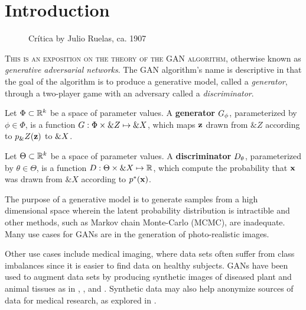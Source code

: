 \section{Introduction}  \setcounter{page}{1}

\vspace{1cm}

\begin{figure}[h]
  \label{fig:paradise} \centering
{}
  \caption{Crítica by Julio Ruelas, ca. 1907}
\end{figure}

\vspace{1cm}

\lettrine[lines=3]{\Royal T}{his is an exposition on the theory of the
GAN algorithm}, otherwise known as \textit{generative adversarial
networks}. The GAN algorithm's name is descriptive in that the goal of
the algorithm is to produce a generative model, called a
\textit{generator}, through a two-player game with an adversary called
a \textit{discriminator}.

\begin{definition}
  \label{def:generator} Let $\Phi \subset \mathbb{R}^k$ be a space of
parameter values. A \textbf{generator} $G_\phi$, parameterized by $\phi
\in \Phi$, is a function $G: \Phi \times \&Z \mapsto \&X$, which
maps $\mathbf{z}$ drawn from $\&Z$ according to $p_\&Z(\mathbf{z})$ to $\&X$.
\end{definition}

\begin{definition}
  \label{def:discriminator} Let $\Theta \subset \mathbb{R}^k$ be a space of
parameter values. A \textbf{discriminator} $D_\theta$, parameterized by
$\theta \in \Theta$, is a function $D: \Theta \times \&X \mapsto
\mathbb{R}$, which compute the probability that $\mathbf{x}$ was drawn from $\&X$
according to $p^*(\mathbf{x})$.
\end{definition}

The purpose of a generative model is to generate samples from a high
dimensional space wherein the latent probability distribution is
intractible and other methods, such as Markov chain Monte-Carlo
(MCMC), are inadequate. Many use cases for GANs are in the generation
of photo-realistic images.

Other use cases include medical imaging, where data sets often suffer
from class imbalances since it is easier to find data on healthy
subjects. GANs have been used to augment data sets by producing
synthetic images of diseased plant and animal tissues as in
\cite{ref:nazki-2018}, \cite{ref:valerio-2017}, and
\cite{ref:frid-2018}. Synthetic data may also help anonymize sources
of data for medical research, as explored in \cite{ref:shin-2018}.

